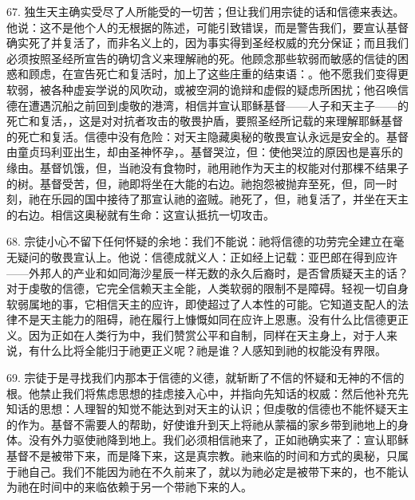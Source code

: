 67. 独生天主确实受尽了人所能受的一切苦；但让我们用宗徒的话和信德来表达。他说：这不是他个人的无根据的陈述，可能引致错误，而是警告我们，要宣认基督确实死了并复活了，而非名义上的，因为事实得到圣经权威的充分保证；而且我们必须按照圣经所宣告的确切含义来理解祂的死。他顾念那些软弱而敏感的信徒的困惑和顾虑，在宣告死亡和复活时，加上了这些庄重的结束语：。他不愿我们变得更软弱，被各种虚妄学说的风吹动，或被空洞的诡辩和虚假的疑虑所困扰；他召唤信德在遭遇沉船之前回到虔敬的港湾，相信并宣认耶稣基督——人子和天主子——的死亡和复活，，这是对对抗者攻击的敬畏护盾，要照圣经所记载的来理解耶稣基督的死亡和复活。信德中没有危险：对天主隐藏奥秘的敬畏宣认永远是安全的。基督由童贞玛利亚出生，却由圣神怀孕，。基督哭泣，但：使他哭泣的原因也是喜乐的缘由。基督饥饿，但，当祂没有食物时，祂用祂作为天主的权能对付那棵不结果子的树。基督受苦，但，祂即将坐在大能的右边。祂抱怨被抛弃至死，但，同一时刻，祂在乐园的国中接待了那宣认祂的盗贼。祂死了，但，祂复活了，并坐在天主的右边。相信这奥秘就有生命：这宣认抵抗一切攻击。\par

68. 宗徒小心不留下任何怀疑的余地：我们不能说：祂将信德的功劳完全建立在毫无疑问的敬畏宣认上。他说：信德成就义人：正如经上记载：亚巴郎在得到应许——外邦人的产业和如同海沙星辰一样无数的永久后裔时，是否曾质疑天主的话？对于虔敬的信德，它完全信赖天主全能，人类软弱的限制不是障碍。轻视一切自身软弱属地的事，它相信天主的应许，即使超过了人本性的可能。它知道支配人的法律不是天主能力的阻碍，祂在履行上慷慨如同在应许上恩惠。没有什么比信德更正义。因为正如在人类行为中，我们赞赏公平和自制，同样在天主身上，对于人来说，有什么比将全能归于祂更正义呢？祂是谁？人感知到祂的权能没有界限。\par

69. 宗徒于是寻找我们内那本于信德的义德，就斩断了不信的怀疑和无神的不信的根。他禁止我们将焦虑思想的挂虑接入心中，并指向先知话的权威：然后他补充先知话的思想：人理智的知觉不能达到对天主的认识；但虔敬的信德也不能怀疑天主的作为。基督不需要人的帮助，好使谁升到天上将祂从蒙福的家乡带到祂地上的身体。没有外力驱使祂降到地上。我们必须相信祂来了，正如祂确实来了：宣认耶稣基督不是被带下来，而是降下来，这是真宗教。祂来临的时间和方式的奥秘，只属于祂自己。我们不能因为祂在不久前来了，就以为祂必定是被带下来的，也不能认为祂在时间中的来临依赖于另一个带祂下来的人。\par

